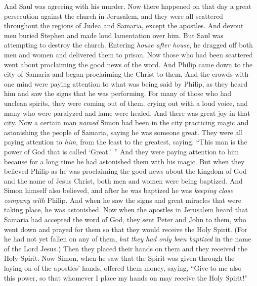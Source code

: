 \begin{biblechapter} %
 And Saul was agreeing with his murder. Now there happened on that day a great persecution against the church in Jerusalem, and they were all scattered throughout the regions of Judea and Samaria, except the apostles.
\verse And devout men buried Stephen and made loud lamentation over him.
\verse But Saul was attempting to destroy the church. Entering \textit{house after house}, he dragged off both men and women and delivered them to prison.
 Now those who had been scattered went about proclaiming the good news of the word.
\verse And Philip came down to the city of Samaria and began proclaiming the Christ to them.
\verse And the crowds with one mind were paying attention to what was being said by Philip, as they heard him and saw the signs that he was performing.
\verse For many of those who had unclean spirits, they were coming out of them, crying out with a loud voice, and many who were paralyzed and lame were healed.
\verse And there was great joy in that city.
 Now a certain man \textit{named} Simon had been in the city practicing magic and astonishing the people of Samaria, saying he was someone great.
\verse They were all paying attention to \textit{him}, from the least to the greatest, saying, “This man is the power of God that is called ‘Great.’ ”
\verse And they were paying attention to him because for a long time he had astonished them with his magic.
\verse But when they believed Philip as he was proclaiming the good news about the kingdom of God and the name of Jesus Christ, both men and women were being baptized.
\verse And Simon himself also believed, and after he was baptized he was \textit{keeping close company with} Philip. And when he saw the signs and great miracles that were taking place, he was astonished.
\verse Now when the apostles in Jerusalem heard that Samaria had accepted the word of God, they sent Peter and John to them,
\verse who went down and prayed for them so that they would receive the Holy Spirit.
\verse (For he had not yet fallen on any of them, \textit{but they had only been baptized} in the name of the Lord Jesus.)
\verse Then they placed their hands on them and they received the Holy Spirit.
\verse Now Simon, when he saw that the Spirit was given through the laying on of the apostles’ hands, offered them money,
\verse saying, “Give to me also this power, so that whomever I place my hands on may receive the Holy Spirit!”

\end{biblechapter}
